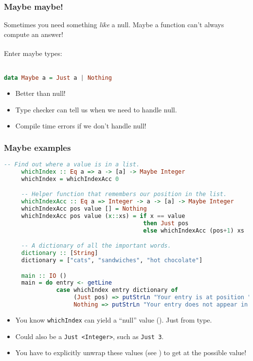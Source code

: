 \documentclass{beamer}
\begin{document}
\begin{frame}[fragile]
  \frametitle{Maybe maybe!}

  Sometimes you need something \emph{like} a null. Maybe a function can't always compute an answer! \\~\\

  \pause
  Enter maybe types: \\~\\

  \begin{lstlisting}[frame=single, language=Haskell, breaklines=true, basicstyle=\ttfamily\tiny]
    data Maybe a = Just a | Nothing
  \end{lstlisting}

  \pause

  \begin{itemize}
  \item Better than null!
  \item Type checker can tell us when we need to handle null.
  \item Compile time errors if we don't handle null!
  \end{itemize}
\end{frame}

\begin{frame}[fragile]
  \frametitle{Maybe examples}

  \begin{lstlisting}[frame=single, language=Haskell, breaklines=true, basicstyle=\ttfamily\tiny]
     -- Find out where a value is in a list.
     whichIndex :: Eq a => a -> [a] -> Maybe Integer
     whichIndex = whichIndexAcc 0

     -- Helper function that remembers our position in the list.
     whichIndexAcc :: Eq a => Integer -> a -> [a] -> Maybe Integer
     whichIndexAcc pos value [] = Nothing
     whichIndexAcc pos value (x::xs) = if x == value
                                        then Just pos
                                        else whichIndexAcc (pos+1) xs

     -- A dictionary of all the important words.
     dictionary :: [String]
     dictionary = ["cats", "sandwiches", "hot chocolate"]

     main :: IO ()
     main = do entry <- getLine
               case whichIndex entry dictionary of
                    (Just pos) => putStrLn "Your entry is at position " ++ show pos ++ " in the dictionary."
                    Nothing => putStrLn "Your entry does not appear in the dictionary."
  \end{lstlisting}

  \begin{itemize}
  \item You know \texttt{whichIndex} can yield a ``null'' value (). Just from type.
  \item Could also be a \texttt{Just <Integer>}, such as \texttt{Just 3}.
  \item You have to explicitly unwrap these values (see ) to get at the possible value!
  \end{itemize}
\end{frame}
\end{document}
